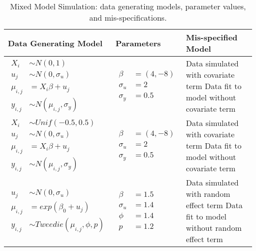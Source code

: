 \begin{table}[h]
    \caption{Mixed Model Simulation: data generating models, parameter values, and mis-specifications.}
    \begin{tabular}{llp{8cm}}
    \toprule
    Data Generating Model & Parameters & Mis-specified Model \\
    \hline
    {$\!\begin{aligned}
    X_{i} &\sim N(0, 1) \\
    u_{j} &\sim N(0, \sigma_{u}) \\
    \mu_{i, j} &= X_{i}\beta + u_{j} \\
    y_{i,j} &\sim N(\mu_{i,j}, \sigma_{y}) 
    \end{aligned}$}
    &
    {$\!\begin{aligned}
    \beta &= (4, -8) \\
    \sigma_{u} &= 2 \\
    \sigma_{y} &=  0.5
    \end{aligned}$}
    &
    Data simulated with covariate term \newline
    Data fit to model without covariate term\\
    \hline
    {$\!\begin{aligned}
    X_{i} &\sim Unif(-0.5, 0.5) \\
    u_{j} &\sim N(0, \sigma_{u}) \\
    \mu_{i, j} &= X_{i}\beta + u_{j} \\
    y_{i,j} &\sim N(\mu_{i,j}, \sigma_{y}) 
    \end{aligned}$}
    &
    {$\!\begin{aligned}
    \beta &= (4, -8) \\
    \sigma_{u} &= 2 \\
    \sigma_{y} &= 0.5
    \end{aligned}$}
    &
    Data simulated with covariate term \newline
    Data fit to model without covariate term\\
    \hline
    {$\!\begin{aligned}
    u_{j} &\sim N(0, \sigma_{u}) \\
    \mu_{i, j} &= exp(\beta_{0} + u_{j}) \\
    y_{i,j} &\sim Tweedie(\mu_{i,j}, \phi, p) 
    \end{aligned}$}
    &
    {$\!\begin{aligned}
    \beta &= 1.5 \\
    \sigma_{u} &= 1.4 \\
    \phi &= 1.4 \\
    p &= 1.2
    \end{aligned}$}
    &
    Data simulated with random effect term \newline
    Data fit to model without random effect term\\
    \bottomrule
    \end{tabular}
    \end{table}